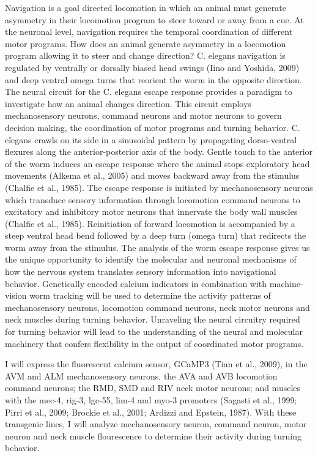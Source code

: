 Navigation is a goal directed locomotion in which an animal must generate asymmetry in their locomotion program to steer toward or away from a cue.  At the neuronal level, navigation requires the temporal coordination of different motor programs.  How does an animal generate asymmetry in a locomotion program allowing it to steer and change direction?  C. elegans navigation is regulated by ventrally or dorsally biased head swings (Iino and Yoshida, 2009) and deep ventral omega turns that reorient the worm in the opposite direction.  The neural circuit for the C. elegans escape response provides a paradigm to investigate how an animal changes direction.  This circuit employs mechanosensory neurons, command neurons and motor neurons to govern decision making, the coordination of motor programs and turning behavior. C. elegans crawls on its side in a sinusoidal pattern by propagating dorso-ventral flexures along the anterior-posterior axis of the body.  Gentle touch to the anterior of the worm induces an escape response where the animal stops exploratory head movements (Alkema et al., 2005) and moves backward away from the stimulus (Chalfie et al., 1985).  The escape response is initiated by mechanosensory neurons which transduce sensory information through locomotion command neurons to excitatory and inhibitory motor neurons that innervate the body wall muscles (Chalfie et al., 1985).  Reinitiation of forward locomotion is accompanied by a steep ventral head bend followed by a deep turn (omega turn) that redirects the worm away from the stimulus.  The analysis of the worm escape response gives us the unique opportunity to identify the molecular and neuronal mechanisms of how the nervous system translates sensory information into navigational behavior. Genetically encoded calcium indicators in combination with machine-vision worm tracking will be used to determine the activity patterns of mechanosensory neurons, locomotion command neurons, neck motor neurons and neck muscles during turning behavior.  Unraveling the neural circuitry required for turning behavior will lead to the understanding of the neural and molecular machinery that confers flexibility in the output of coordinated motor programs.

I will express the fluorescent calcium sensor, GCaMP3 (Tian et al., 2009), in the AVM and ALM mechanosensory neurons, the AVA and AVB locomotion command neurons; the RMD, SMD and RIV neck motor neurons; and muscles with the mec-4, rig-3, lgc-55, lim-4 and myo-3 promoters (Sagasti et al., 1999; Pirri et al., 2009; Brockie et al., 2001; Ardizzi and Epstein, 1987).  With these transgenic lines, I will analyze mechanosensory neuron, command neuron, motor neuron and neck muscle flourescence to determine their activity during turning behavior.

